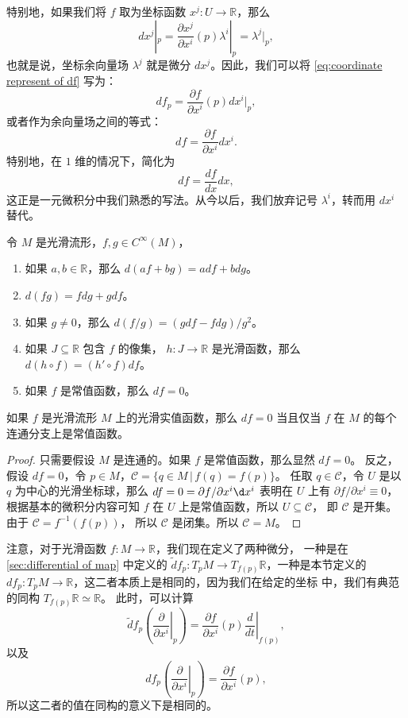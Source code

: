 \documentclass[fontset=none]{Notes}
\begin{document}
特别地，如果我们将 $f$ 取为坐标函数 $x^j:U\to \mathbb{R}$，那么
\[
  dx^j|_p=  \frac{\partial x^j}{\partial x^i}(p)\lambda^i|_p
  =\lambda^j|_p,
\]
也就是说，坐标余向量场 $\lambda^j$ 就是微分 $dx^j$。因此，我们可以将
\eqref{eq:coordinate represent of df} 写为：
\[
  df_p=  \frac{\partial f}{\partial x^i}(p)dx^i|_p,
\]
或者作为余向量场之间的等式：
\begin{equation}
  df=\frac{\partial f}{\partial x^i}dx^i.
\end{equation}
特别地，在 $1$ 维的情况下，简化为
\[
  df=\frac{df}{dx}dx,  
\]
这正是一元微积分中我们熟悉的写法。从今以后，我们放弃记号
$\lambda^i$，转而用 $dx^i$ 替代。

\begin{proposition}[微分的性质]
  令 $M$ 是光滑流形，$f,g\in C^\infty(M)$，
  \begin{enumerate}
    \item 如果 $a,b\in \mathbb{R}$，那么
    $d(af+bg)=adf+bdg$。
    \item $d(fg)=fdg+gdf$。
    \item 如果 $g\neq 0$，那么 $d(f/g)=(gdf-fdg)/g^2$。
    \item 如果 $J\subseteq \mathbb{R}$ 包含 $f$ 的像集，
    $h:J\to \mathbb{R}$ 是光滑函数，那么
    $d(h\circ f)=(h'\circ f)df$。
    \item 如果 $f$ 是常值函数，那么 $df=0$。
  \end{enumerate}
\end{proposition}

\begin{proposition}[微分为零的函数]\label{prop:functions with vanishing differential}
  如果 $f$ 是光滑流形 $M$ 上的光滑实值函数，那么 $df=0$
  当且仅当 $f$ 在 $M$ 的每个连通分支上是常值函数。
\end{proposition}
\begin{proof}
  只需要假设 $M$ 是连通的。如果 $f$ 是常值函数，那么显然 $df=0$。
  反之，假设 $df=0$，令 $p\in M$，$\mathcal{C}=\{q\in M\,|\, f(q)=f(p)\}$。
  任取 $q\in \mathcal{C}$，令 $U$ 是以 $q$ 为中心的光滑坐标球，那么
  $df=0=\partial f/\partial x^i \d x^i$ 表明在 $U$ 上有
  $\partial f/\partial x^i\equiv 0$，根据基本的微积分内容可知
  $f$ 在 $U$ 上是常值函数，所以 $U\subseteq \mathcal{C}$，
  即 $\mathcal{C}$ 是开集。由于 $\mathcal{C}=f^{-1}(f(p))$，
  所以 $\mathcal{C}$ 是闭集。所以 $\mathcal{C}=M$。
\end{proof}


注意，对于光滑函数 $f:M\to \mathbb{R}$，我们现在定义了两种微分，
一种是在 \ref{sec:differential of map} 中定义的
$\tilde{d}\!f_p:T_pM\to T_{f(p)}\mathbb{R}$，一种是本节定义的
$df_p:T_pM\to \mathbb{R}$，这二者本质上是相同的，因为我们在给定的坐标
中，我们有典范的同构 $T_{f(p)}\mathbb{R}\simeq \mathbb{R}$。
此时，可以计算
\[
  \tilde d\!f_p\left(\left.\frac{\partial}{\partial x^i}\right|_p\right)
  =\frac{\partial f}{\partial x^i}(p)\left.\frac{d}{dt}\right|_{f(p)},
\]
以及
\[
  df_p   \left(\left.\frac{\partial}{\partial x^i}\right|_p\right)
  =\frac{\partial f}{\partial x^i}(p),
\]
所以这二者的值在同构的意义下是相同的。
\end{document}
